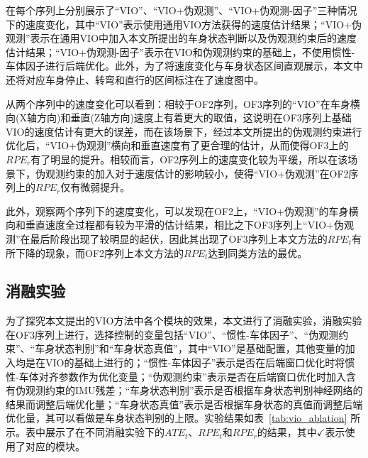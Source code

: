 在每个序列上分别展示了“VIO”、“VIO+伪观测”、“VIO+伪观测-因子”三种情况下的速度变化，其中“VIO”表示使用通用VIO方法获得的速度估计结果；“VIO+伪观测”表示在通用VIO中加入本文所提出的车身状态判断以及伪观测约束后的速度估计结果；“VIO+伪观测-因子”表示在VIO和伪观测约束的基础上，不使用惯性-车体因子进行后端优化。此外，为了将速度变化与车身状态区间直观展示，本文中还将对应车身停止、转弯和直行的区间标注在了速度图中。

从两个序列中的速度变化可以看到：相较于OF2序列，OF3序列的“VIO”在车身横向(X轴方向)和垂直(Z轴方向)速度上有着更大的取值，这说明在OF3序列上基础VIO的速度估计有更大的误差，而在该场景下，经过本文所提出的伪观测约束进行优化后，“VIO+伪观测”横向和垂直速度有了更合理的估计，从而使得OF3上的$RPE_r$有了明显的提升。相较而言，OF2序列上的速度变化较为平缓，所以在该场景下，伪观测约束的加入对于速度估计的影响较小，使得“VIO+伪观测”在OF2序列上的$RPE_r$仅有微弱提升。

此外，观察两个序列下的速度变化，可以发现在OF2上，“VIO+伪观测”的车身横向和垂直速度全过程都有较为平滑的估计结果，相比之下OF3序列上“VIO+伪观测”在最后阶段出现了较明显的起伏，因此其出现了OF3序列上本文方法的$RPE_t$有所下降的现象，而OF2序列上本文方法的$RPE_t$达到同类方法的最优。


\subsection{消融实验}
为了探究本文提出的VIO方法中各个模块的效果，本文进行了消融实验，消融实验在OF3序列上进行，选择控制的变量包括“VIO”、“惯性-车体因子”、“伪观测约束”、“车身状态判别”和“车身状态真值”，其中“VIO”是基础配置，其他变量的加入均是在VIO的基础上进行的；“惯性-车体因子”表示是否在后端窗口优化时将惯性-车体对齐参数作为优化变量；“伪观测约束”表示是否在后端窗口优化时加入含有伪观测约束的IMU残差；“车身状态判别”表示是否根据车身状态判别神经网络的结果而调整后端优化量；“车身状态真值”表示是否根据车身状态的真值而调整后端优化量，其可以看做是车身状态判别的上限。实验结果如表~\ref{tab:vio_ablation} 所示。表中展示了在不同消融实验下的$ATE_t$、$RPE_t$和$RPE_r$的结果，其中$\checkmark$表示使用了对应的模块。

